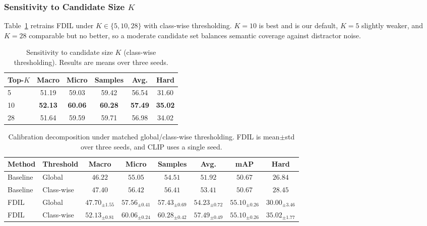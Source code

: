 \subsubsection{Sensitivity to Candidate Size $K$}

Table~\ref{tab:k_sensitivity_test} retrains FDIL under $K \in \{5,10,28\}$ with class-wise thresholding. $K=10$ is best and is our default, $K=5$ slightly weaker, and $K=28$ comparable but no better, so a moderate candidate set balances semantic coverage against distractor noise.

\begin{table}[htbp]
\centering
\caption{Sensitivity to candidate size $K$ (class-wise thresholding). Results are means over three seeds.}
\label{tab:k_sensitivity_test}
\begin{tabular}{lccccc}
\hline
Top-$K$ & Macro & Micro & Samples & Avg. & Hard \\
\hline
5 & 51.19 & 59.03 & 59.42 & 56.54 & 31.60 \\
10 & \textbf{52.13} & \textbf{60.06} & \textbf{60.28} & \textbf{57.49} & \textbf{35.02} \\
28 & 51.64 & 59.59 & 59.71 & 56.98 & 34.02 \\
\hline
\end{tabular}
\end{table}

\begin{table}[htbp]
\centering
\footnotesize
\caption{Calibration decomposition under matched global/class-wise thresholding. FDIL is mean$\pm$std over three seeds, and CLIP uses a single seed.}
\label{tab:thresholding_test}
\setlength{\tabcolsep}{3pt}
\begin{tabular}{llcccccc}
\hline
Method & Threshold & Macro & Micro & Samples & Avg. & mAP & Hard \\
\hline
Baseline & Global & $46.22$ & $55.05$ & $54.51$ & $51.92$ & $50.67$ & $26.84$ \\
Baseline & Class-wise & $47.40$ & $56.42$ & $56.41$ & $53.41$ & $50.67$ & $28.45$ \\
\hline
FDIL & Global & $47.70_{\pm1.55}$ & $57.56_{\pm0.41}$ & $57.43_{\pm0.69}$ & $54.23_{\pm0.72}$ & $\mathbf{55.10}_{\pm0.26}$ & $30.00_{\pm3.46}$ \\
FDIL & Class-wise & $\mathbf{52.13}_{\pm0.81}$ & $\mathbf{60.06}_{\pm0.24}$ & $\mathbf{60.28}_{\pm0.42}$ & $\mathbf{57.49}_{\pm0.49}$ & $\mathbf{55.10}_{\pm0.26}$ & $\mathbf{35.02}_{\pm1.77}$ \\
\hline
\end{tabular}
\end{table}

